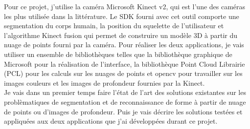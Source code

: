 Pour ce projet, j'utilise la caméra Microsoft Kinect v2, qui est l'une des caméras les plus utilisée dans la littérature. Le SDK fourni
avec cet outil comporte une segmentation du corps humain, la position du squelette de l'utilisateur et l'algorithme Kinect fusion qui
permet de construire un modèle 3D à partir du nuage de points fourni par la caméra.
Pour réaliser les deux applications, je vais utiliser un ensemble de bibliothèques telles que la bibliothèque graphique de Microsoft pour
la réalisation de l'interface, la bibliothèque \og Point Cloud Librairie \fg\cite{PCL}(PCL) pour les calculs sur les nuages de points et 
opencv pour travailler sur les images couleurs et les images de profondeur fournies par la Kinect.\\

Je vais dans un premier temps faire l'état de l'art des solutions existantes sur les problèmatiques de segmentation et de reconnaissance de
forme à partir de nuage de points ou d'images de profondeur. Puis je vais décrire les solutions testées et appliquées aux deux applications que j'ai
développées durant ce projet.

